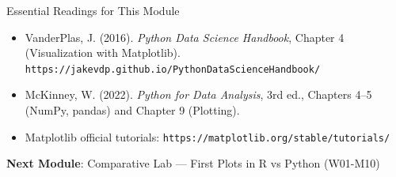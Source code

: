\documentclass[10pt]{beamer}
\begin{document}
\begin{frame}{Essential Readings for This Module}
  \begin{itemize}
    \item VanderPlas, J. (2016). \emph{Python Data Science Handbook},
          Chapter 4 (Visualization with Matplotlib).
          \texttt{https://jakevdp.github.io/PythonDataScienceHandbook/}
    \item McKinney, W. (2022). \emph{Python for Data Analysis}, 3rd ed.,
          Chapters 4--5 (NumPy, pandas) and Chapter 9 (Plotting).
    \item Matplotlib official tutorials:
          \texttt{https://matplotlib.org/stable/tutorials/}
  \end{itemize}

  \vspace{6pt}
  \textbf{Next Module}: Comparative Lab --- First Plots in R vs Python (W01-M10)
\end{frame}
\end{document}
